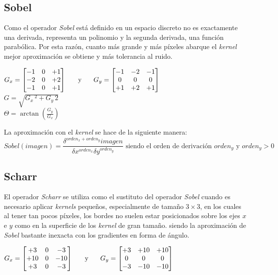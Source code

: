 \subsection{Sobel}
Como el operador \emph{Sobel} está definido en un espacio discreto no
es exactamente una derivada, representa un polinomio y la segunda
derivada, una función parabólica. Por esta razón, cuanto más grande y
más píxeles abarque el \emph{kernel} mejor aproximación se obtiene y
más tolerancia al ruido.
\begin{center}
  $ G_x = \begin{bmatrix}
    -1 & 0 & +1 \\
    -2 & 0 & +2 \\
    -1 & 0 & +1 \\
  \end{bmatrix}
  \hspace{0.5cm} \text{ y } \hspace{0.5cm} G_y = \begin{bmatrix}
    -1 & -2 & -1 \\
    0 & 0 & 0 \\
    +1 & +2 & +1 \\
  \end{bmatrix}
  $
  \\[0.5cm]
  $G = \sqrt{G_x\,^2 + G_y\,{2}}$
  \\[0.5cm]
  $\Theta= \arctan\left(\frac{G_y}{G_x} \right)$
\end{center}
La aproximación con el \emph{kernel} se hace de la siguiente manera:
\begin{equation*}
  Sobel(imagen) = \frac{\delta^{orden_x + orden_y} imagen}{\delta x^{orden_x} \delta
    y^{orden_y}} \text{ siendo el orden de derivación } orden_y \text{ y } orden_y > 0
\end{equation*}

\subsection{Scharr}
El operador \emph{Scharr} se utiliza como el sustituto del operador
\emph{Sobel} cuando es necesario aplicar \emph{kernels} pequeños,
especialmente de tamaño $3 \times 3$, en los cuales al tener tan pocos
píxeles, los bordes no suelen estar posicionados sobre los ejes $x$ e
$y$ como en la superficie de los \emph{kernel} de gran tamaño. siendo
la aproximación de \emph{Sobel} bastante inexacta con los gradientes
en forma de ángulo.
\begin{center}
  $ G_x = \begin{bmatrix}
    +3 & 0 & -3 \\
    +10 & 0 & -10 \\
    +3 & 0 & -3 \\
  \end{bmatrix}
  \hspace{0.5cm} \text{ y } \hspace{0.5cm} G_y = \begin{bmatrix}
    +3 & +10 & +10 \\
    0 & 0 & 0 \\
    -3 & -10 & -10 \\
  \end{bmatrix}
  $
\end{center}
